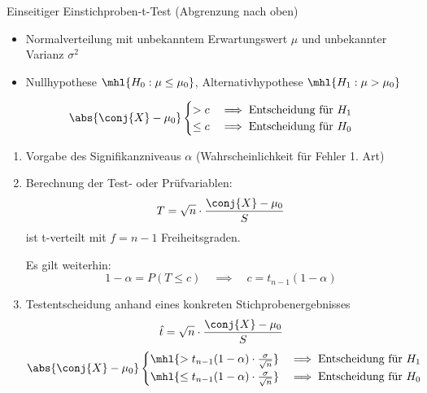 \begin{algo}{Einseitiger Einstichproben-t-Test (Abgrenzung nach oben)}
    \begin{itemize}
        \item Normalverteilung mit unbekanntem Erwartungswert $\mu$ und unbekannter Varianz $\sigma^2$
        \item Nullhypothese $\mhl{H_0: \mu \leq \mu_0}$, Alternativhypothese $\mhl{H_1: \mu > \mu_0}$
    \end{itemize}
    \[
        \abs{\conj{X} - \mu_0}
        \begin{cases}
            > c    & \implies \text{Entscheidung für $H_1$} \\
            \leq c & \implies \text{Entscheidung für $H_0$}
        \end{cases}
    \]

    \begin{enumerate}
        \item Vorgabe des Signifikanzniveaus $\alpha$ (Wahrscheinlichkeit für Fehler 1. Art)
        \item Berechnung der Test- oder Prüfvariablen:
              \[
                  T = \sqrt{n} \cdot \frac{\conj{X} - \mu_0}{S}
              \]
              ist t-verteilt mit $f = n-1$ Freiheitsgraden.

              Es gilt weiterhin:
              \[
                  1 - \alpha = P(T \leq c) \quad \implies \quad c = t_{n-1} (1 - \alpha)
              \]
        \item Testentscheidung anhand eines konkreten Stichprobenergebnisses
              \[
                  \hat{t} = \sqrt{n} \cdot \frac{\conj{X} - \mu_0}{S}
              \]
              \[
                  \abs{\conj{X} - \mu_0}
                  \begin{cases}
                      \mhl{ > t_{n-1} (1 - \alpha) \cdot \frac{\sigma}{\sqrt{n}}}    & \implies \text{Entscheidung für $H_1$} \\
                      \mhl{ \leq t_{n-1} (1 - \alpha) \cdot \frac{\sigma}{\sqrt{n}}} & \implies \text{Entscheidung für $H_0$}
                  \end{cases}
              \]
    \end{enumerate}
\end{algo}

